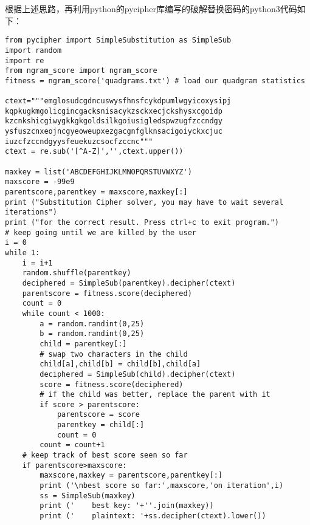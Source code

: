 \documentclass{article}
\begin{document}
根据上述思路，再利用python的pycipher库编写的破解替换密码的python3代码如下：

\begin{lstlisting}[title=break\_simplesub.py, frame=shadowbox]
from pycipher import SimpleSubstitution as SimpleSub
import random
import re
from ngram_score import ngram_score
fitness = ngram_score('quadgrams.txt') # load our quadgram statistics

ctext="""emglosudcgdncuswysfhnsfcykdpumlwgyicoxysipj
kqpkugkmgolicgincgacksnisacykzsckxecjckshysxcgoidp
kzcnkshicgiwygkkgkgoldsilkgoiusigledspwzugfzccndgy
ysfuszcnxeojncgyeoweupxezgacgnfglknsacigoiyckxcjuc
iuzcfzccndgyysfeuekuzcsocfzccnc"""
ctext = re.sub('[^A-Z]','',ctext.upper())

maxkey = list('ABCDEFGHIJKLMNOPQRSTUVWXYZ')
maxscore = -99e9
parentscore,parentkey = maxscore,maxkey[:]
print ("Substitution Cipher solver, you may have to wait several iterations")
print ("for the correct result. Press ctrl+c to exit program.")
# keep going until we are killed by the user
i = 0
while 1:
    i = i+1
    random.shuffle(parentkey)
    deciphered = SimpleSub(parentkey).decipher(ctext)
    parentscore = fitness.score(deciphered)
    count = 0
    while count < 1000:
        a = random.randint(0,25)
        b = random.randint(0,25)
        child = parentkey[:]
        # swap two characters in the child
        child[a],child[b] = child[b],child[a]
        deciphered = SimpleSub(child).decipher(ctext)
        score = fitness.score(deciphered)
        # if the child was better, replace the parent with it
        if score > parentscore:
            parentscore = score
            parentkey = child[:]
            count = 0
        count = count+1
    # keep track of best score seen so far
    if parentscore>maxscore:
        maxscore,maxkey = parentscore,parentkey[:]
        print ('\nbest score so far:',maxscore,'on iteration',i)
        ss = SimpleSub(maxkey)
        print ('    best key: '+''.join(maxkey))
        print ('    plaintext: '+ss.decipher(ctext).lower())
\end{lstlisting}
\end{document}
